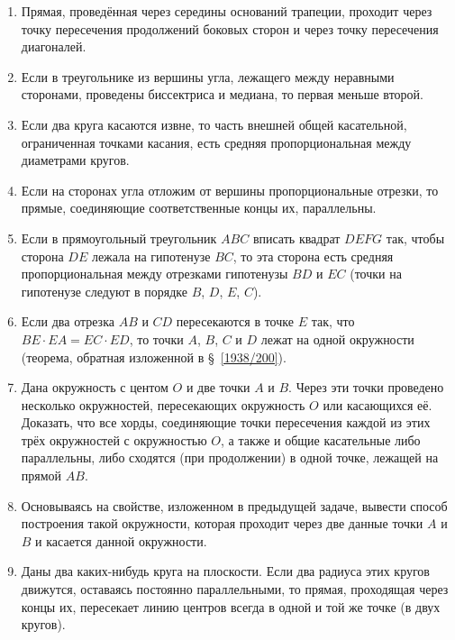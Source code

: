\documentclass[oneside]{book}
\begin{document}
\begin{enumerate}

 \item
Прямая, проведённая через середины оснований трапеции, проходит через точку пересечения продолжений боковых сторон и через точку пересечения диагоналей.

 \item
Если в треугольнике из вершины угла, лежащего между неравными сторонами, проведены биссектриса и медиана, то первая меньше второй.

 \item
Если два круга касаются извне, то часть внешней общей касательной, ограниченная точками касания, есть средняя пропорциональная между диаметрами кругов.

 \item
Если на сторонах угла отложим от вершины пропорциональные отрезки, то прямые, соединяющие соответственные концы их, параллельны.

 \item
Если в прямоугольный треугольник $ABC$ вписать квадрат $DEFG$ так, чтобы сторона $DE$ лежала на гипотенузе $BC$, то эта сторона есть средняя пропорциональная между отрезками гипотенузы $BD$ и $EC$ (точки на гипотенузе следуют в порядке $B$, $D$, $E$, $C$).

 \item
Если два отрезка $AB$ и $CD$ пересекаются в точке $E$ так, что $BE\cdot  EA=EC\cdot  ED$, то точки $A$, $B$, $C$ и $D$ лежат на одной окружности (теорема, обратная изложенной в §~\ref{1938/200}).

 \item
Дана окружность с центом $O$ и две точки $A$ и $B$.
Через эти точки проведено несколько окружностей, пересекающих окружность $O$ или касающихся её.
Доказать, что все хорды, соединяющие точки пересечения каждой из этих трёх окружностей с окружностью $O$, а также и общие касательные либо параллельны, либо сходятся (при продолжении) в одной точке, лежащей на прямой $AB$. 

 \item
Основываясь на свойстве, изложенном в предыдущей задаче, вывести способ построения такой окружности, которая проходит через две данные точки $A$ и $B$ и касается данной окружности.

 \item
Даны два каких-нибудь круга на плоскости.
Если два радиуса этих кругов движутся, оставаясь постоянно параллельными, то прямая, проходящая через концы их, пересекает линию центров всегда в одной и той же точке (в  двух кругов).


\end{enumerate}
\end{document}
